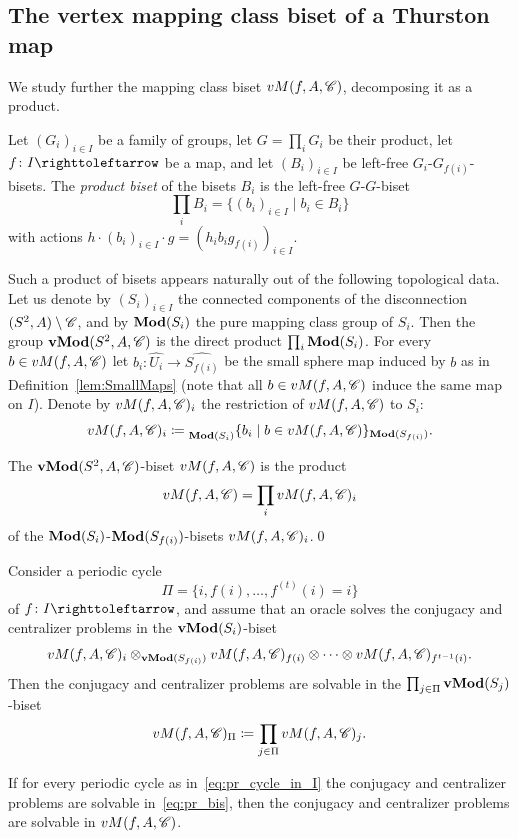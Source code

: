 \documentclass{amsart}
\begin{document}
\subsection{The vertex mapping class biset of a Thurston map}
We study further the mapping class biset $vM(f,A,\CC)$, decomposing it
as a product.

\begin{defn}
  Let $(G_i)_{i\in I}$ be a family of groups, let $G=\prod_i G_i$ be
  their product, let $f\colon I\selfmap$ be a map, and let
  $(B_i)_{i\in I}$ be left-free $G_i$-$G_{f(i)}$-bisets.  The
  \emph{product biset} of the bisets $B_i$ is the left-free
  $G$-$G$-biset
  \[\prod_i B_i=\{(b_i)_{i\in I}\mid b_i\in B_i\}
  \]
  with actions
  $h\cdot(b_i)_{i\in I}\cdot g=(h_i b_i g_{f(i)})_{i\in I}$.
\end{defn}

Such a product of bisets appears naturally out of the following
topological data. Let us denote by $(S_i)_{i\in I}$ the connected
components of the disconnection $(S^2,A)\setminus \CC$, and by
$\Mod(S_i)$ the pure mapping class group of $S_i$. Then the group
$\Mod[v](S^2,A,\CC)$ is the direct product $\prod_i\Mod(S_i)$.  For
every $b\in vM(f,A,\CC)$ let $b_i\colon \widehat{U_i}\to
\widehat{S_{f(i)}}$ be the small sphere map induced by $b$ as in
Definition~\ref{lem:SmallMaps} (note that all $b\in vM(f,A,\CC)$
induce the same map on $I$). Denote by $vM(f,A,\CC)_i$ the restriction
of $vM(f,A,\CC)$ to $S_i$:
\[vM(f,A,\CC)_i\coloneqq\subscript{\Mod(S_i)}\{b_i\mid b\in vM(f,A,\CC)\}_{\Mod(S_{f(i)})}.\]

\begin{lem}
  The $\Mod[v](S^2,A,\CC)$-biset $vM(f,A,\CC)$ is the product
  \[vM(f,A,\CC)=\prod_{i} vM(f,A,\CC)_i
  \]
  of the $\Mod(S_i)$-$\Mod(S_{f(i)})$-bisets
  $vM(f,A,\CC)_i$.\qed
\end{lem}

\begin{prop}\label{prop:bisets_gluing}
  Consider a periodic cycle
  \begin{equation}\label{eq:pr_cycle_in_I}
    \Pi=\{i,f(i),\dots, f^{(t)}(i)=i\}
  \end{equation}
  of $f\colon I\selfmap$, and assume that an oracle solves the
  conjugacy and centralizer problems in the $\Mod[v](S_i)$-biset
  \begin{equation}\label{eq:tens_pr_bis}
    vM(f,A,\CC)_i\otimes_{\Mod[v](S_{f(i)})}vM(f,A,\CC)_{f(i)}\otimes\cdots\otimes vM(f,A,\CC)_{f^{t-1}(i)}.
  \end{equation}
  Then the conjugacy and centralizer problems are solvable in the
  $\prod_{j\in\Pi}\Mod[v](S_{j})$-biset
  \begin{equation}\label{eq:pr_bis}
    vM(f,A,\CC)_\Pi\coloneqq\prod_{j\in\Pi}vM(f,A,\CC)_j.
  \end{equation}

  If for every periodic cycle as in~\eqref{eq:pr_cycle_in_I} the
  conjugacy and centralizer problems are solvable
  in~\eqref{eq:pr_bis}, then the conjugacy and centralizer problems
  are solvable in $vM(f,A,\CC)$.
\end{prop}
\end{document}
